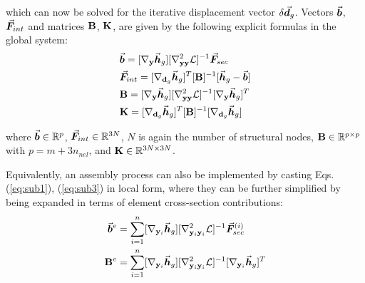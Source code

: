 \noindent which can now be solved for the iterative displacement vector
$\delta\vec{\boldsymbol{d}}_g$. Vectors $\vec{\boldsymbol{b}}$, $\vec{\boldsymbol{F}}_{int}$ and matrices
$\mathbf{B}$, $\mathbf{K}$, are given by the following explicit formulas
in the global system:
\begin{subequations}
	\begin{align}
		&\vec{\boldsymbol{b}}
		=[\nabla_{\mathbf{y}}\vec{\boldsymbol{h}}_g][\nabla^2_{\mathbf{yy}}\mathcal{L}]^{-1}\vec{\boldsymbol{F}}_{sec}\label{eq:sub1}\\
		&\vec{\boldsymbol{F}}_{int} =
		[\nabla_{\mathbf{d}_g}\vec{\boldsymbol{h}}_g]^T[\mathbf{B}]^{-1}[\vec{\boldsymbol{h}}_g-\vec{\boldsymbol{b}}]\label{eq:sub2}\\
		&\mathbf{B}
		=[\nabla_{\mathbf{y}}\vec{\boldsymbol{h}}_g][\nabla^2_{\mathbf{yy}}\mathcal{L}]^{-1}[\nabla_{\mathbf{y}}\vec{\boldsymbol{h}}_g]^T
		 \label{eq:sub3}\\
		&\mathbf{K}
		=[\nabla_{\mathbf{d}_g}\vec{\boldsymbol{h}}_g]^T[\mathbf{B}]^{-1}[\nabla_{\mathbf{d}_g}\vec{\boldsymbol{h}}_g]\label{eq:sub4}
	\end{align}
\end{subequations}

\noindent where $\vec{\boldsymbol{b}}\in\mathbb{R}^p$, $\vec{\boldsymbol{F}}_{int}\in\mathbb{R}^{3N}$,
$N$ is again the number of structural nodes,
$\mathbf{B}\in\mathbb{R}^{p\times p}$ with $p=m+3n_{nel}$, and
$\mathbf{K}\in\mathbb{R}^{3N\times 3N}$. 

Equivalently, an
assembly process can also be implemented by casting 
Eqs. (\ref{eq:sub1}), (\ref{eq:sub3}) in local form, where they can be further 
simplified by being expanded in terms of element cross-section contributions:
\begin{subequations}
	\begin{align}
		\vec{\boldsymbol{b}}^e&=\sum_{i=1}^n
		[\nabla_{\mathbf{y}_i}\vec{\boldsymbol{h}}_g][\nabla^2_{\mathbf{y}_i\mathbf{y}_i}\mathcal{L}]^{-1}\vec{\boldsymbol{F}}_{sec}^{(i)}\label{eq:subb}\\
		\mathbf{B}^e &= \sum_{i=1}^n
		[\nabla_{\mathbf{y}_i}\vec{\boldsymbol{h}}_g][\nabla^2_{\mathbf{y}_i\mathbf{y}_i}\mathcal{L}]^{-1}[\nabla_{\mathbf{y}_i}\vec{\boldsymbol{h}}_g]^T\label{eq:subB}
	\end{align}
\end{subequations}


